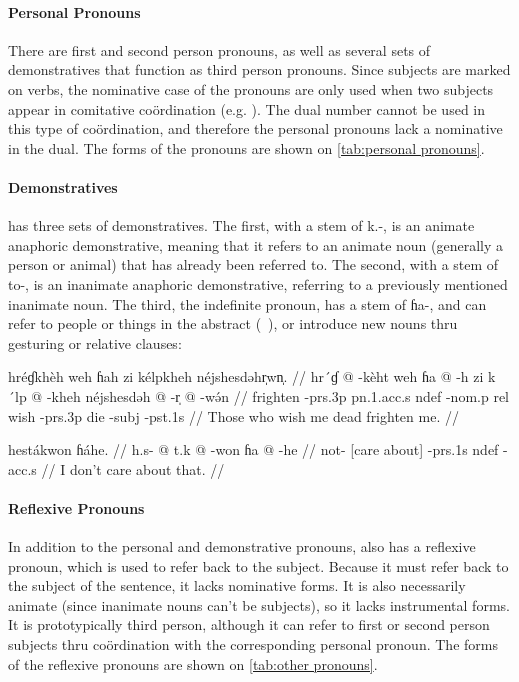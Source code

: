 \paragraph{Personal Pronouns} There are first and second person pronouns, as
well as several sets of demonstratives that function as third person pronouns.
Since subjects are marked on verbs, the nominative case of the pronouns are
only used when two subjects appear in comitative coördination (e.g. ). The dual number cannot be used in this type of coördination,
and therefore the personal pronouns lack a nominative in the dual. The forms of
the pronouns are shown on \cref{tab:personal pronouns}.

\paragraph{Demonstratives} \Langname{} has three sets of demonstratives. The
first, with a stem of {\ll k.-}, is an animate anaphoric demonstrative, meaning
that it refers to an animate noun (generally a person or animal) that has
already been referred to. The second, with a stem of {\ll to-}, is an
inanimate anaphoric demonstrative, referring to a previously mentioned
inanimate noun. The third, the indefinite pronoun, has a stem of {\ll ɦa-}, and
can refer to people or things in the abstract (\ie\ ), or introduce
new nouns thru gesturing or relative clauses:

\pex
\a
\begingl
\glpreamble hréɠkhèh weh ɦah zi kélpkheh néjshesdəhr̩wn̩. //
\gla hr´ɠ @ -kèht weh ɦa @ -h zi k´lp @ -kheh néjshesdəh @ -r̩ @
-wə́n //
\glb frighten -{\sc prs}.3p {\sc pn}.1.{\sc acc}.s {\sc ndef} -{\sc nom}.p {\sc
    rel} wish -{\sc prs}.3p die -{\sc subj} -{\sc pst}.1s //
\glft Those who wish me dead frighten me. //
\endgl

\a
\begingl
    \glpreamble hestákwon ɦáhe. //
    \gla h.s- @ t.k @ -won ɦa @ -he //
    \glb not- {[care about]} -{\sc prs}.1s {\sc ndef} -{\sc acc}.s //
    \glft I don't care about that. //
\endgl
\xe

\paragraph{Reflexive Pronouns} In addition to the personal and demonstrative
pronouns, \Langname{} also has a reflexive pronoun, which is used to
refer back to the subject. Because it must refer back to the subject of the
sentence, it lacks nominative forms. It is also necessarily animate (since
inanimate nouns can't be subjects), so it lacks instrumental forms. It is
prototypically third person, although it can refer to first or second person
subjects thru coördination with the corresponding personal pronoun. The forms
of the reflexive pronouns are shown on \cref{tab:other pronouns}.

